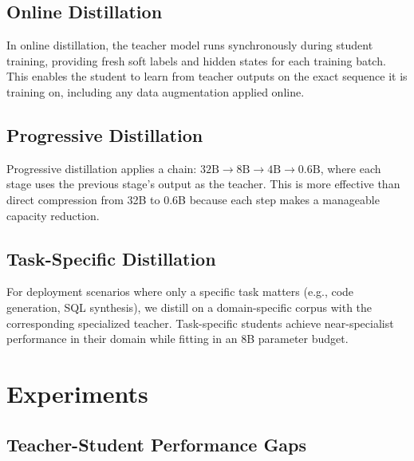 \documentclass[11pt,a4paper]{article}
\begin{document}
\subsection{Online Distillation}

In online distillation, the teacher model runs synchronously during student training,
providing fresh soft labels and hidden states for each training batch. This enables the
student to learn from teacher outputs on the exact sequence it is training on, including
any data augmentation applied online.

\subsection{Progressive Distillation}

Progressive distillation \cite{hinton2015distilling,salimans2022progressive} applies a
chain: $32\text{B} \to 8\text{B} \to 4\text{B} \to 0.6\text{B}$, where each stage
uses the previous stage's output as the teacher. This is more effective than direct
compression from 32B to 0.6B because each step makes a manageable capacity reduction.

\subsection{Task-Specific Distillation}

For deployment scenarios where only a specific task matters (e.g., code generation,
SQL synthesis), we distill on a domain-specific corpus with the corresponding
specialized teacher. Task-specific students achieve near-specialist performance in
their domain while fitting in an 8B parameter budget.

\section{Experiments}
\label{sec:experiments}

\subsection{Teacher-Student Performance Gaps}
\end{document}
